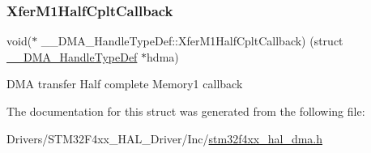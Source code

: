 \subsubsection{\texorpdfstring{Xfer\+M1\+Half\+Cplt\+Callback}{XferM1HalfCpltCallback}}
{\footnotesize\ttfamily void($\ast$  \+\_\+\+\_\+\+D\+M\+A\+\_\+\+Handle\+Type\+Def\+::\+Xfer\+M1\+Half\+Cplt\+Callback) (struct \hyperlink{struct_____d_m_a___handle_type_def}{\+\_\+\+\_\+\+D\+M\+A\+\_\+\+Handle\+Type\+Def} $\ast$hdma)}

D\+MA transfer Half complete Memory1 callback 

The documentation for this struct was generated from the following file\+:\begin{DoxyCompactItemize}
\item 
Drivers/\+S\+T\+M32\+F4xx\+\_\+\+H\+A\+L\+\_\+\+Driver/\+Inc/\hyperlink{stm32f4xx__hal__dma_8h}{stm32f4xx\+\_\+hal\+\_\+dma.\+h}\end{DoxyCompactItemize}
